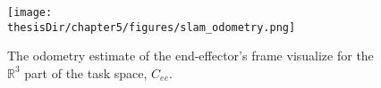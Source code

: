\begin{figure}
  \centering
  \captionsetup{justification=centering}
  \texttt{[image: \\thesisDir/chapter5/figures/slam\_odometry.png]}
  \caption{The odometry estimate of the end-effector's frame visualize for the
  $\mathbb{R}^3$ part of the task space, $C_{ee}$.}
  \label{fig:slam_odometry}
\end{figure}

